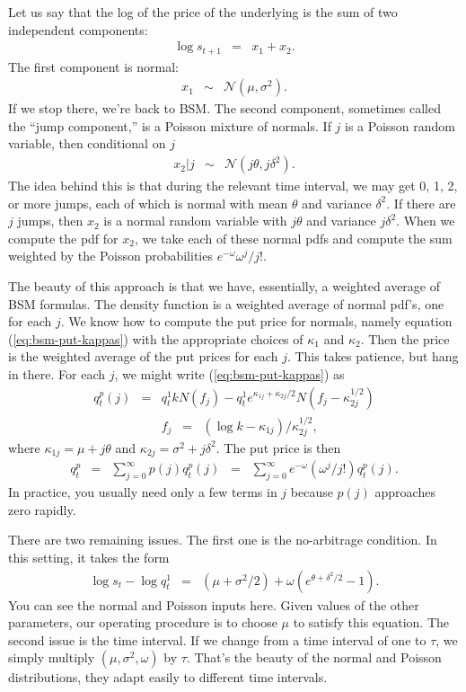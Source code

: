 \documentclass[11pt]{article}
\begin{document}
Let us say that the log of the price of the underlying is the sum
of two independent components:
\begin{eqnarray*}
    \log s_{t+1} &=& x_1 + x_2 .
\end{eqnarray*}
The first component is normal:
\begin{eqnarray*}
    x_1 &\sim& \mathcal{N}(\mu, \sigma^2) .
\end{eqnarray*}
If we stop there, we're back to BSM.
The second component, sometimes called the ``jump component,'' is a Poisson mixture of normals.
If $j$ is a Poisson random variable, then conditional on $j$
\begin{eqnarray*}
    x_2 | j &\sim& \mathcal{N}(j\theta, j\delta^2) .
\end{eqnarray*}
The idea behind this is that during the relevant time interval,
we may get 0, 1, 2, or more jumps, each of which is normal
with mean $\theta$ and variance $\delta^2$.
If there are $j$ jumps, then $x_2$ is
a normal random variable with $j\theta$ and variance $j\delta^2$.
When we compute the pdf for $x_2$,
we take each of these normal pdfs and compute the sum weighted
by the Poisson probabilities $e^{-\omega} \omega^j / j!$.

The beauty of this approach is that we have, essentially, a weighted average
of BSM formulas.
The density function is a weighted average of normal pdf's, one for each $j$.
We know how to compute the put price for normals, namely equation (\ref{eq:bsm-put-kappas})
with the appropriate choices of $\kappa_1$ and $\kappa_2$.
Then the price is the weighted average of the put prices for each $j$.
This takes patience, but hang in there.
For each $j$, we might write (\ref{eq:bsm-put-kappas}) as
\begin{eqnarray*}
    q^p_t(j) &=& q^1_t k N (f_j) - q^1_t e^{\kappa_{1j} + \kappa_{2j}/2}
            N ( f_j - \kappa_{2j}^{1/2} ) \\
     &&  f_j \;\;=\;\; (\log k - \kappa_{1j})/\kappa_{2j}^{1/2} ,
\end{eqnarray*}
where $\kappa_{1j} = \mu + j \theta $ and $\kappa_{2j} = \sigma^2 + j \delta^2$.
The put price is then
\begin{eqnarray*}
    q^p_t &=& \sum_{j=0}^\infty p(j) q^p_t(j)
            \;\;=\;\; \sum_{j=0}^\infty e^{-\omega} (\omega^j / j!) q^p_t(j) .
\end{eqnarray*}
In practice, you usually need only a few terms in $j$ because $p(j)$
approaches zero rapidly.


There are two remaining issues.
The first one is the no-arbitrage condition.
In this setting, it takes the form
\begin{eqnarray*}
    \log s_t - \log q^1_t &=& \left(\mu + \sigma^2/2 \right)
            + \omega \left( e^{\theta+\delta^2/2} - 1 \right) .
\end{eqnarray*}
You can see the normal and Poisson inputs here.
Given values of the other parameters, our operating procedure is
to choose $\mu$ to satisfy this equation.
The second issue is the time interval.
If we change from a time interval of one to $\tau$, we simply multiply
$(\mu, \sigma^2, \omega)$ by $\tau$.
That's the beauty of the normal and Poisson distributions,
they adapt easily to different time intervals.
\end{document}
